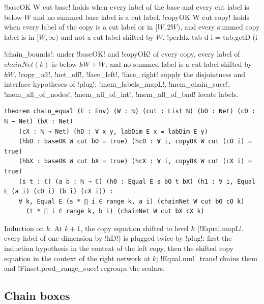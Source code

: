 {\begin{definition}\label{def:boxes-baseOK}
\lbx!baseOK W cut base! holds when every label of the base and every cut label is below $W$ and no summed base label is a cut label. \lbx!copyOK W cut copy! holds when every label of the copy is a cut label or in $[W,2W)$, and every summed copy label is in $[W,\infty)$ and not a cut label shifted by $W$. \lbx!perIdx tab d i = tab.getD (i %
\end{definition}

\lbx!chain_bounds!: under \lbx!baseOK! and \lbx!copyOK! of every copy, every label of $\mathit{chainNet}(k)$ is below $kW+W$, and no summed label is a cut label shifted by $kW$. \lbx!copy_off!, \lbx!net_off!, \lbx!face_left!, \lbx!face_right! supply the disjointness and interface hypotheses of \lbx!plug!; \lbx!mem_labels_mapL!, \lbx!mem_chain_succ!, \lbx!mem_all_of_nodes!, \lbx!mem_all_of_int!, \lbx!mem_all_of_bnd! locate labels.

\begin{theorem}\label{thm:boxes-chain-equal}
\begin{lstlisting}[style=leanbox]
theorem chain_equal (E : Env) (W : ℕ) (cut : List ℕ) (bO : Net) (cO : ℕ → Net) (bX : Net)
    (cX : ℕ → Net) (hD : ∀ x y, labDim E x = labDim E y)
    (hbO : baseOK W cut bO = true) (hcO : ∀ i, copyOK W cut (cO i) = true)
    (hbX : baseOK W cut bX = true) (hcX : ∀ i, copyOK W cut (cX i) = true)
    (s t : ℂ) (a b : ℕ → ℂ) (h0 : Equal E s bO t bX) (h1 : ∀ i, Equal E (a i) (cO i) (b i) (cX i)) :
    ∀ k, Equal E (s * ∏ i ∈ range k, a i) (chainNet W cut bO cO k)
      (t * ∏ i ∈ range k, b i) (chainNet W cut bX cX k)
\end{lstlisting}
\end{theorem}
\noindent Induction on $k$. At $k+1$, the copy equation shifted to level $k$ (\lbx!Equal.mapL!, every label of one dimension by \lbx!hD!) is plugged twice by \lbx!plug!: first the induction hypothesis in the context of the left copy, then the shifted copy equation in the context of the right network at $k$; \lbx!Equal.mul_trans! chains them and \lbx!Finset.prod_range_succ! regroups the scalars.

\subsection{Chain boxes}

}
